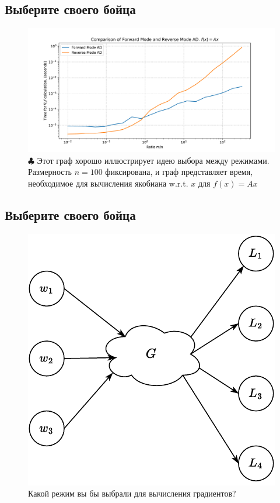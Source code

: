 \documentclass[
  russian,
  letterpaper,
  DIV=11,
  numbers=noendperiod]{scrartcl}
\begin{document}
\subsection{Выберите своего
бойца}\label{ux432ux44bux431ux435ux440ux438ux442ux435-ux441ux432ux43eux435ux433ux43e-ux431ux43eux439ux446ux430-1}

\begin{figure}[H]

{\centering \includegraphics[width=0.88\linewidth,height=\textheight,keepaspectratio]{forward_vs_reverse_ad.pdf}

}

\caption{\href{https://colab.research.google.com/github/MerkulovDaniil/optim/blob/master/assets/Notebooks/Autograd_and_Jax.ipynb}{\(\clubsuit\)}
Этот граф хорошо иллюстрирует идею выбора между режимами. Размерность
\(n = 100\) фиксирована, и граф представляет время, необходимое для
вычисления якобиана w.r.t. \(x\) для \(f(x) = Ax\)}

\end{figure}%

\subsection{Выберите своего
бойца}\label{ux432ux44bux431ux435ux440ux438ux442ux435-ux441ux432ux43eux435ux433ux43e-ux431ux43eux439ux446ux430-2}

\begin{figure}[H]

{\centering \includegraphics[width=0.6\linewidth,height=\textheight,keepaspectratio]{ad_mixed.pdf}

}

\caption{Какой режим вы бы выбрали для вычисления градиентов?}

\end{figure}%
\end{document}
